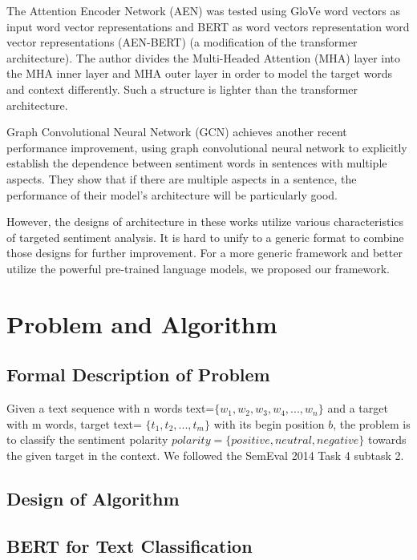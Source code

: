 \documentclass[fyp]{socreport}
\begin{document}
The Attention Encoder Network (AEN) \cite {ArxSong} was tested using GloVe word vectors as input word vector representations and BERT as word vectors representation word vector representations (AEN-BERT) (a modification of the transformer architecture). The author divides the Multi-Headed Attention (MHA) layer into the MHA inner layer and MHA outer layer in order to model the target words and context differently. Such a structure is lighter than the transformer architecture.

Graph Convolutional Neural Network (GCN) \cite {ArxZhaoa2019} achieves another recent performance improvement, using graph convolutional neural network to explicitly establish the dependence between sentiment words in sentences with multiple aspects. They show that if there are multiple aspects in a sentence, the performance of their model's architecture will be particularly good.

However, the designs of architecture in these works utilize various characteristics of targeted sentiment analysis. It is hard to unify to a generic format to combine those designs for further improvement. For a more generic framework and better utilize the powerful pre-trained language models, we proposed our framework.




\chapter{Problem and Algorithm}
\section{Formal Description of Problem}
Given a text sequence with n words text=$\{w_1,w_2,w_3,w_4,...,w_n\}$ and a target with m words, target text=  $\{t_1,t_2,...,t_m\}$ with its begin position $b$, the problem is to classify the sentiment polarity $polarity=\{positive,neutral,negative\}$ towards the given target in the context. We followed the SemEval 2014 Task 4\cite{pontiki-etal-2014-semeval} subtask 2.




\section{Design of Algorithm}
\section{BERT for Text Classification}
\end{document}
